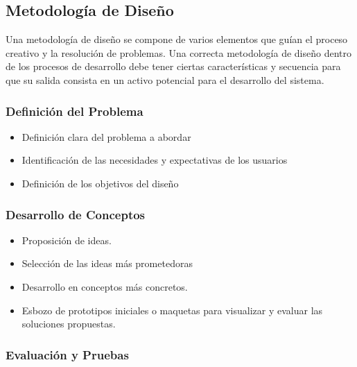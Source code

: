 \documentclass[spanish, 12pt]{article}
\providecommand{\tightlist}{\setlength{\itemsep}{0pt}
\setlength{\parskip}{0pt}}
\begin{document}
	\subsection{Metodología de Diseño}
	\label{metodologuxeda-de-diseuxf1o}

	Una metodología de diseño se compone de varios elementos que guían el proceso creativo
	y la resolución de problemas. Una correcta metodología de diseño dentro de los
	procesos de desarrollo debe tener ciertas características y secuencia para que
	su salida consista en un activo potencial para el desarrollo del sistema.

	\subsubsection{Definición del Problema}
	\label{definiciuxf3n-del-problema}

	\begin{itemize}
		\tightlist

		\item Definición clara del problema a abordar

		\item Identificación de las necesidades y expectativas de los usuarios

		\item Definición de los objetivos del diseño
	\end{itemize}

	\subsubsection{Desarrollo de Conceptos}
	\label{desarrollo-de-conceptos}

	\begin{itemize}
		\tightlist

		\item Proposición de ideas.

		\item Selección de las ideas más prometedoras

		\item Desarrollo en conceptos más concretos.

		\item Esbozo de prototipos iniciales o maquetas para visualizar y evaluar las
			soluciones propuestas.
	\end{itemize}

	\subsubsection{Evaluación y Pruebas}
	\label{evaluaciuxf3n-y-pruebas}
\end{document}
